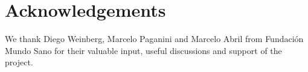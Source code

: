 
\section{Acknowledgements}

We thank Diego Weinberg, Marcelo Paganini and Marcelo Abril from Fundación Mundo Sano for their valuable input, useful discussions and support of the project.
